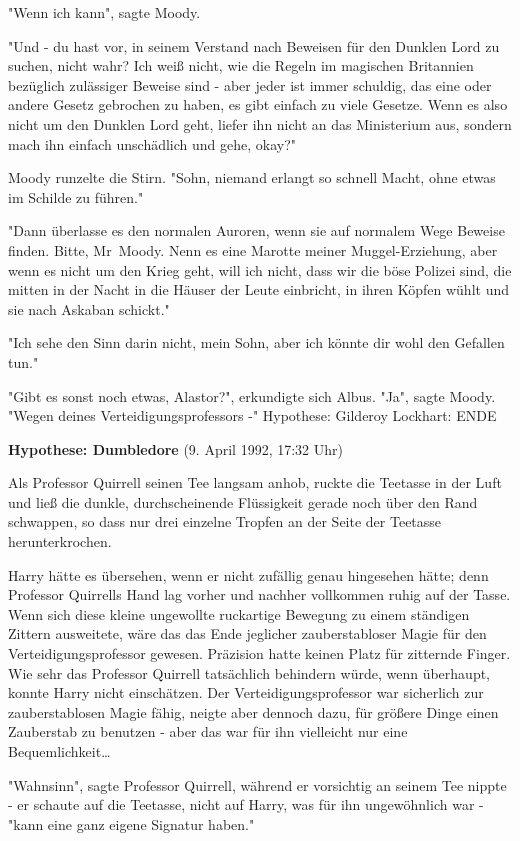 {"Wenn ich kann", sagte Moody.

"Und - du hast vor, in seinem Verstand nach Beweisen für den Dunklen Lord zu suchen, nicht wahr? Ich weiß nicht, wie die Regeln im magischen Britannien bezüglich zulässiger Beweise sind - aber jeder ist immer schuldig, das eine oder andere Gesetz gebrochen zu haben, es gibt einfach zu viele Gesetze. Wenn es also nicht um den Dunklen Lord geht, liefer ihn nicht an das Ministerium aus, sondern mach ihn einfach unschädlich und gehe, okay?"

Moody runzelte die Stirn. "Sohn, niemand erlangt so schnell Macht, ohne etwas im Schilde zu führen."

"Dann überlasse es den normalen Auroren, wenn sie auf normalem Wege Beweise finden. Bitte, Mr~Moody. Nenn es eine Marotte meiner Muggel-Erziehung, aber wenn es nicht um den Krieg geht, will ich nicht, dass wir die böse Polizei sind, die mitten in der Nacht in die Häuser der Leute einbricht, in ihren Köpfen wühlt und sie nach Askaban schickt."

"Ich sehe den Sinn darin nicht, mein Sohn, aber ich könnte dir wohl den Gefallen tun."

"Gibt es sonst noch etwas, Alastor?", erkundigte sich Albus. "Ja", sagte Moody. "Wegen deines Verteidigungsprofessors -" Hypothese: Gilderoy Lockhart: ENDE

\textbf{Hypothese: Dumbledore} (9. April 1992, 17:32 Uhr)

Als Professor Quirrell seinen Tee langsam anhob, ruckte die Teetasse in der Luft und ließ die dunkle, durchscheinende Flüssigkeit gerade noch über den Rand schwappen, so dass nur drei einzelne Tropfen an der Seite der Teetasse herunterkrochen.

Harry hätte es übersehen, wenn er nicht zufällig genau hingesehen hätte; denn Professor Quirrells Hand lag vorher und nachher vollkommen ruhig auf der Tasse. Wenn sich diese kleine ungewollte ruckartige Bewegung zu einem ständigen Zittern ausweitete, wäre das das Ende jeglicher zauberstabloser Magie für den Verteidigungsprofessor gewesen. Präzision hatte keinen Platz für zitternde Finger. Wie sehr das Professor Quirrell tatsächlich behindern würde, wenn überhaupt, konnte Harry nicht einschätzen. Der Verteidigungsprofessor war sicherlich zur zauberstablosen Magie fähig, neigte aber dennoch dazu, für größere Dinge einen Zauberstab zu benutzen - aber das war für ihn vielleicht nur eine Bequemlichkeit…

"Wahnsinn", sagte Professor Quirrell, während er vorsichtig an seinem Tee nippte - er schaute auf die Teetasse, nicht auf Harry, was für ihn ungewöhnlich war - "kann eine ganz eigene Signatur haben."

}
